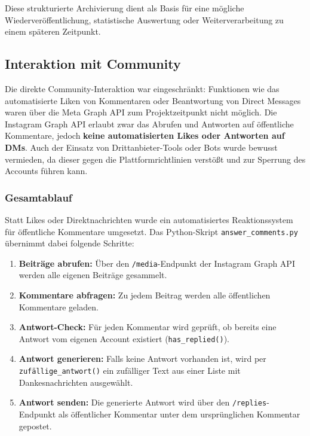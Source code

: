 \documentclass[a4paper,12pt]{article}
\begin{document}
Diese strukturierte Archivierung dient als Basis für eine mögliche Wiederveröffentlichung, statistische Auswertung oder Weiterverarbeitung zu einem späteren Zeitpunkt.


\subsection{Interaktion mit Community}

Die direkte Community-Interaktion war eingeschränkt: Funktionen wie das automatisierte Liken von Kommentaren oder Beantwortung von Direct Messages waren über die Meta Graph API zum Projektzeitpunkt nicht möglich. Die Instagram Graph API erlaubt zwar das Abrufen und Antworten auf öffentliche Kommentare, jedoch \textbf{keine automatisierten Likes oder Antworten auf DMs}. Auch der Einsatz von Drittanbieter-Tools oder Bots wurde bewusst vermieden, da dieser gegen die Plattformrichtlinien verstößt und zur Sperrung des Accounts führen kann.

\subsubsection*{Gesamtablauf}

Statt Likes oder Direktnachrichten wurde ein automatisiertes Reaktionssystem für öffentliche Kommentare umgesetzt. Das Python-Skript \texttt{answer\_comments.py} übernimmt dabei folgende Schritte:

\begin{enumerate}
    \item \textbf{Beiträge abrufen:} Über den \texttt{/media}-Endpunkt der Instagram Graph API werden alle eigenen Beiträge gesammelt.

    \item \textbf{Kommentare abfragen:} Zu jedem Beitrag werden alle öffentlichen Kommentare geladen.

    \item \textbf{Antwort-Check:} Für jeden Kommentar wird geprüft, ob bereits eine Antwort vom eigenen Account existiert (\texttt{has\_replied()}).

    \item \textbf{Antwort generieren:} Falls keine Antwort vorhanden ist, wird per \texttt{zufällige\_antwort()} ein zufälliger Text aus einer Liste mit Dankesnachrichten ausgewählt.

    \item \textbf{Antwort senden:} Die generierte Antwort wird über den \texttt{/replies}-Endpunkt als öffentlicher Kommentar unter dem ursprünglichen Kommentar gepostet.
\end{enumerate}
\end{document}
